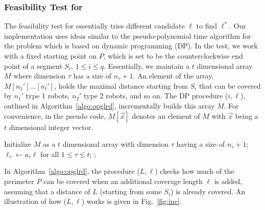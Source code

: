 \subsubsection{Feasibility Test for \opglrd} The feasibility test for \opglrd 
essentially tries different candidate $\ell$ to find $\ell^*$. Our implementation uses 
ideas similar to the pseudo-polynomial time algorithm for the \knapsack problem which
is based on dynamic programming (DP). In the test, we work with a fixed starting point on 
$P$, which is set to be the counterclockwise end point of a segment $S_i$, $1 \le i \le q$. 
Essentially, we maintain a $t$ dimensional array $M$ where dimension $\tau$
has a size of $n_{\tau} +1$. An element of the array, $M[n_1']\ldots[n_t']$, holds the 
maximal distance starting from $S_i$ that can be covered by $n_1'$ type 1 robots, 
$n_2'$ type 2 robots, and so on. The DP procedure \opglrfeasible($i, \ell$), outlined in 
Algorithm~\ref{algo:opglrd}, incrementally builds this array $M$. For convenience,
in the pseudo code, $M[\vec{x}]$ denotes an element of $M$ with $\vec{x}$ being 
a $t$ dimensional integer vector. 

\begin{algorithm}\label{algo:opglrd}
	\DontPrintSemicolon
		Initialize $M$ as a $t$ dimensional array with dimension $\tau$ having a size of $n_{\tau} + 1$;\;
		$\ell_{\tau} \leftarrow a_{\tau}\ell$ for all $1\le \tau \le t$;\;
		;
	\caption{\opglrfeasible($i, \ell$)}
\end{algorithm}

In Algorithm~\ref{algo:opglrd}, the procedure \inc($L, \ell$) checks how much of the 
perimeter $P$ can be covered when an additional coverage length $\ell$ is added, 
assuming that a distance of $L$ (starting from some $S_i$) is already covered. An 
illustration of how \inc($L, \ell$) works is given in Fig.~\ref{fig:inc}.
 

